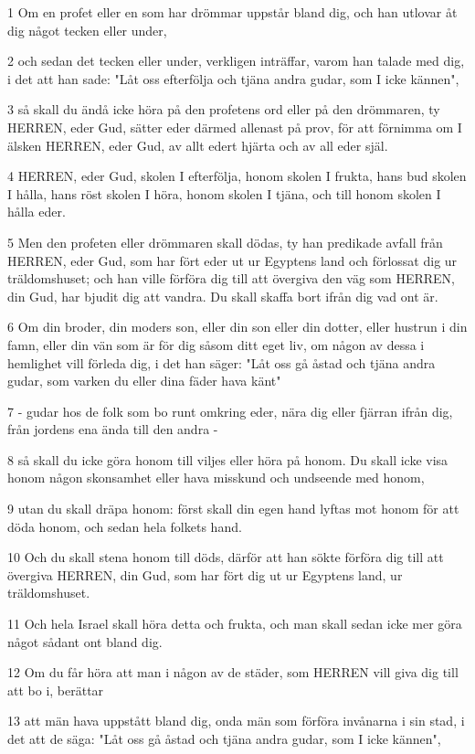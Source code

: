 \par 1 Om en profet eller en som har drömmar uppstår bland dig, och han utlovar åt dig något tecken eller under,
\par 2 och sedan det tecken eller under, verkligen inträffar, varom han talade med dig, i det att han sade: "Låt oss efterfölja och tjäna andra gudar, som I icke kännen",
\par 3 så skall du ändå icke höra på den profetens ord eller på den drömmaren, ty HERREN, eder Gud, sätter eder därmed allenast på prov, för att förnimma om I älsken HERREN, eder Gud, av allt edert hjärta och av all eder själ.
\par 4 HERREN, eder Gud, skolen I efterfölja, honom skolen I frukta, hans bud skolen I hålla, hans röst skolen I höra, honom skolen I tjäna, och till honom skolen I hålla eder.
\par 5 Men den profeten eller drömmaren skall dödas, ty han predikade avfall från HERREN, eder Gud, som har fört eder ut ur Egyptens land och förlossat dig ur träldomshuset; och han ville förföra dig till att övergiva den väg som HERREN, din Gud, har bjudit dig att vandra. Du skall skaffa bort ifrån dig vad ont är.
\par 6 Om din broder, din moders son, eller din son eller din dotter, eller hustrun i din famn, eller din vän som är för dig såsom ditt eget liv, om någon av dessa i hemlighet vill förleda dig, i det han säger: "Låt oss gå åstad och tjäna andra gudar, som varken du eller dina fäder hava känt"
\par 7 - gudar hos de folk som bo runt omkring eder, nära dig eller fjärran ifrån dig, från jordens ena ända till den andra -
\par 8 så skall du icke göra honom till viljes eller höra på honom. Du skall icke visa honom någon skonsamhet eller hava misskund och undseende med honom,
\par 9 utan du skall dräpa honom: först skall din egen hand lyftas mot honom för att döda honom, och sedan hela folkets hand.
\par 10 Och du skall stena honom till döds, därför att han sökte förföra dig till att övergiva HERREN, din Gud, som har fört dig ut ur Egyptens land, ur träldomshuset.
\par 11 Och hela Israel skall höra detta och frukta, och man skall sedan icke mer göra något sådant ont bland dig.
\par 12 Om du får höra att man i någon av de städer, som HERREN vill giva dig till att bo i, berättar
\par 13 att män hava uppstått bland dig, onda män som förföra invånarna i sin stad, i det att de säga: "Låt oss gå åstad och tjäna andra gudar, som I icke kännen",
